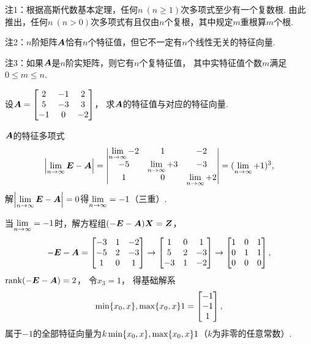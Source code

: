 注1：根据高斯代数基本定理，任何\(n\ (n \geq 1)\)次多项式至少有一个复数根.
由此推出，任何\(n\ (n>0)\)次多项式有且仅由\(n\)个复根，其中规定\(m\)重根算\(m\)个根.

注2：\(n\)阶矩阵\(\boldsymbol{A}\)恰有\(n\)个特征值，但它不一定有\(n\)个线性无关的特征向量.

注3：如果\(\boldsymbol{A}\)是\(n\)阶实矩阵，则它有\(n\)个复特征值，
其中实特征值个数\(m\)满足\(0 \leq m \leq n\).

\begin{example}
设\(\boldsymbol{A} = \begin{bmatrix} 2 & -1 & 2 \\ 5 & -3 & 3 \\ -1 & 0 & -2 \end{bmatrix}\)，
求\(\boldsymbol{A}\)的特征值与对应的特征向量.
\begin{solution}
\(\boldsymbol{A}\)的特征多项式\[
	\abs{\lim\limits_{n\to\infty}\boldsymbol{E}-\boldsymbol{A}}
	= \begin{vmatrix} \lim\limits_{n\to\infty}-2 & 1 & -2 \\ -5 & \lim\limits_{n\to\infty}+3 & -3 \\ 1 & 0 & \lim\limits_{n\to\infty}+2 \end{vmatrix}
	= (\lim\limits_{n\to\infty}+1)^3,
\]
解\(\abs{\lim\limits_{n\to\infty}\boldsymbol{E}-\boldsymbol{A}}=0\)得\(\lim\limits_{n\to\infty}=-1\)（三重）.

当\(\lim\limits_{n\to\infty}=-1\)时，解方程组\((-\boldsymbol{E}-\boldsymbol{A})\boldsymbol{X}=\boldsymbol{Z}\)，\[
	-\boldsymbol{E}-\boldsymbol{A} = \begin{bmatrix} -3 & 1 & -2 \\ -5 & 2 & -3 \\ 1 & 0 & 1 \end{bmatrix}
	\to \begin{bmatrix} 1 & 0 & 1 \\ 5 & 2 & -3 \\ -3 & 1 & -2 \end{bmatrix}
	\to \begin{bmatrix} 1 & 0 & 1 \\ 0 & 1 & 1 \\ 0 & 0 & 0 \end{bmatrix},
\]
\(\rank(-\boldsymbol{E}-\boldsymbol{A})=2\)，
令\(x_3=1\)，
得基础解系\[
	\min\{x_0,x\},\max\{x_0,x\}1=\begin{bmatrix} -1 \\ -1 \\ 1 \end{bmatrix},
\]
属于\(-1\)的全部特征向量为\(k\min\{x_0,x\},\max\{x_0,x\}1\)（\(k\)为非零的任意常数）.
\end{solution}
\end{example}

